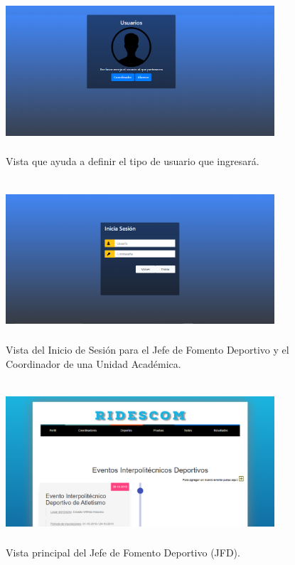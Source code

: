 		\begin{figure} [hbt!]
			\centering
			\includegraphics[width=10cm, height=6cm]{Imagenes/Vistas/VIsta1_TipoSesion}
			\caption{Vista que ayuda a definir el tipo de usuario que ingresará.}
			\label{VistaTipoSesion}
		\end{figure}
	
		\begin{figure} [hbt!]
			\centering
			\includegraphics[width=10cm, height=6cm]{Imagenes/Vistas/Vista2_InicioSesionJFD}
			\caption{Vista del Inicio de Sesión para el Jefe de Fomento Deportivo y el Coordinador de una Unidad Académica.}
			\label{VistaInicioSesionJFD}
		\end{figure}
	
		\begin{figure} [hbt!]
			\centering
			\includegraphics[width=10cm, height=6cm]{Imagenes/Vistas/Vista3_PrincipalJFD}
			\caption{Vista principal del Jefe de Fomento Deportivo (JFD).}
			\label{VistaPrincipalJFD}
		\end{figure}
			
